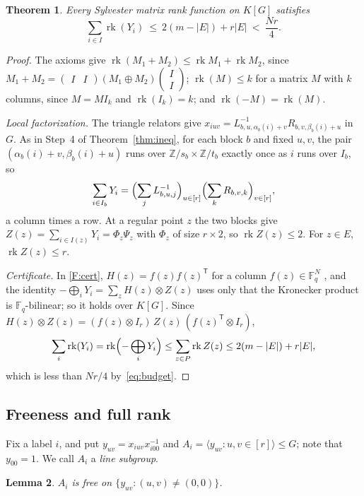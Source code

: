 \documentclass[11pt]{article}
\newtheorem{theorem}{Theorem}[section]
\newtheorem{lemma}[theorem]{Lemma}
\theoremstyle{definition}
\theoremstyle{remark}
\numberwithin{equation}{section}
\DeclareMathOperator{\rk}{rk}
\newcommand{\F}{\mathbb F}
\newcommand{\Z}{\mathbb Z}
\begin{document}
\begin{theorem}\label{thm:collapse}
Every Sylvester matrix rank function on $K[G]$ satisfies
\[
 \sum_{i\in I}\rk(Y_i)\ \le\ 2(m-|E|)+r|E|\ <\ \frac{Nr}{4}.
\]
\end{theorem}

\begin{proof}
The axioms give $\rk(M_1+M_2)\le\rk M_1+\rk M_2$, since $M_1+M_2=\begin{pmatrix}I&I\end{pmatrix}(M_1\oplus M_2)\begin{pmatrix}I\\I\end{pmatrix}$; $\rk(M)\le k$ for a matrix $M$ with $k$ columns, since $M=MI_k$ and $\rk(I_k)=k$; and $\rk(-M)=\rk(M)$.

\emph{Local factorization.} The triangle relators give $x_{iuv}=L_{b,u,\alpha_b(i)+v}^{-1}R_{b,v,\beta_b(i)+u}$ in $G$. As in Step~4 of Theorem~\ref{thm:ineq}, for each block $b$ and fixed $u,v$, the pair $(\alpha_b(i)+v,\beta_b(i)+u)$ runs over $\Z/s_b\times\Z/t_b$ exactly once as $i$ runs over $I_b$, so
\[
 \sum_{i\in I_b}Y_i=\Bigl(\sum_jL_{b,u,j}^{-1}\Bigr)_{u\in[r]}\Bigl(\sum_kR_{b,v,k}\Bigr)_{v\in[r]},
\]
a column times a row. At a regular point $z$ the two blocks give $Z(z)=\sum_{i\in I(z)}Y_i=\Phi_z\Psi_z$ with $\Phi_z$ of size $r\times2$, so $\rk Z(z)\le2$. For $z\in E$, $\rk Z(z)\le r$.

\emph{Certificate.} In \ref{F:cert}, $H(z)=f(z)f(z)^{\mathsf T}$ for a column $f(z)\in\F_q^N$ \cite[Section~2.5]{OAI252}, and the identity $-\bigoplus_iY_i=\sum_zH(z)\otimes Z(z)$ uses only that the Kronecker product is $\F_q$-bilinear; so it holds over $K[G]$. Since $H(z)\otimes Z(z)=(f(z)\otimes I_r)\,Z(z)\,(f(z)^{\mathsf T}\otimes I_r)$,
\[
 \sum_i\rk(Y_i)=\rk\Bigl(-\bigoplus_iY_i\Bigr)\le\sum_{z\in P}\rk Z(z)\le2(m-|E|)+r|E|,
\]
which is less than $Nr/4$ by~\eqref{eq:budget}.
\end{proof}

\subsection{Freeness and full rank}

Fix a label $i$, and put $y_{uv}=x_{iuv}x_{i00}^{-1}$ and $A_i=\langle y_{uv}:u,v\in[r]\rangle\le G$; note that $y_{00}=1$. We call $A_i$ a \emph{line subgroup}.

\begin{lemma}\label{lem:free}
$A_i$ is free on $\{y_{uv}:(u,v)\ne(0,0)\}$.
\end{lemma}
\end{document}
